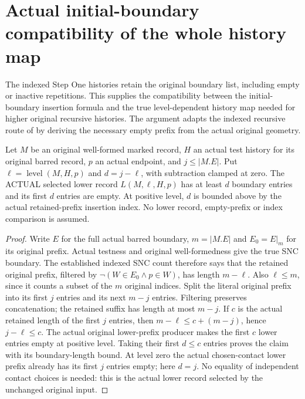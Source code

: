 \section{Actual initial-boundary compatibility of the whole history map}

The indexed Step One histories retain the original boundary list, including
empty or inactive repetitions. This supplies the compatibility between the
initial-boundary insertion formula and the true level-dependent history map
needed for higher original recursive histories. The argument adapts the
indexed recursive route of \cite{wlodarczyk05-hironaka,bierstone-milman08-functoriality}
by deriving the necessary empty prefix from the actual original geometry.

\begin{lemma}
\label{hir:original-initial-boundary-actual-lower-history-prefix}
\leanok
Let $M$ be an original well-formed marked record, $H$ an actual test history
for its original barred record, $p$ an actual endpoint, and $j\leq |M.E|$.
Put $\ell=\operatorname{level}(M,H,p)$ and $d=j-\ell$, with subtraction
clamped at zero. The ACTUAL selected lower record $L(M,\ell,H,p)$ has at
least $d$ boundary entries and its first $d$ entries are empty. At positive
level, $d$ is bounded above by the actual retained-prefix insertion index.
No lower record, empty-prefix or index comparison is assumed.
\end{lemma}
\begin{proof}
Write $E$ for the full actual barred boundary, $m=|M.E|$ and
$E_0=E\vert_m$ for its original prefix. Actual testness and original
well-formedness give the true SNC boundary. The established indexed SNC
count therefore says that the retained original prefix, filtered by
$\neg(W\in E_0\mathbin{\wedge}p\in W)$, has length $m-\ell$.
Also $\ell\leq m$, since it counts a subset of the $m$ original indices.
Split the literal original prefix into its first $j$ entries and its next
$m-j$ entries. Filtering preserves concatenation; the retained suffix has
length at most $m-j$. If $c$ is the actual retained length of the first
$j$ entries, then $m-\ell\leq c+(m-j)$, hence $j-\ell\leq c$.
The actual original lower-prefix producer makes the first $c$ lower entries
empty at positive level. Taking their first $d\leq c$ entries proves the
claim with its boundary-length bound. At level zero the actual chosen-contact
lower prefix already has its first $j$ entries empty; here $d=j$.
No equality of independent contact choices is needed: this is the actual
lower record selected by the unchanged original input.
\end{proof}

